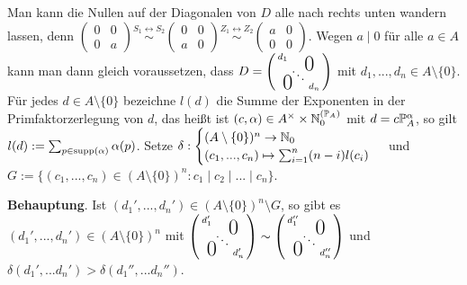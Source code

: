 \documentclass[../../main.tex]{subfiles}
\begin{document}
\begin{cproof}
Man kann die Nullen auf der Diagonalen von $D$ alle nach rechts unten wandern lassen, denn $\begin{pmatrix*}0&0\\ 0&a\end{pmatrix*}\stackrel{S_1\leftrightarrow S_2}{\sim}\begin{pmatrix*}0&0\\ a&0\end{pmatrix*}\stackrel{Z_1\leftrightarrow Z_2}{\sim}\begin{pmatrix*}a&0\\0&0\end{pmatrix*}$. Wegen $a\mid 0$ für alle $a\in A$ kann man dann gleich voraussetzen, dass $D= \left(\begin{smallmatrix}
d_1 & & \llap{$\overset{\blap{\LARGE 0}}{~}$} \\
& \ddots &\\
\rlap{\tlap{\LARGE 0}} & & d_n
\end{smallmatrix}\right)$ mit $d_1,...,d_n\in A\setminus\{0\}$. Für jedes $d\in A\setminus\{0\}$ bezeichne $l(d)$ die Summe der Exponenten in der Primfaktorzerlegung von $d$, das heißt ist $(c,\alpha)\in A^\times\times \expfam$ mit $d=c\P_A^\alpha$, so gilt $l(d):=\sum_{p\in\supp(\alpha)}\alpha(p)$. Setze $\delta:\begin{cases}(A\setminus\{0\})^n\to\N_0\\(c_1,...,c_n)\mapsto \sum_{i=1}^n(n-i)l(c_i)\end{cases}$ und $G:=\{(c_1,...,c_n)\in (A\setminus\{0\})^n: c_1\mid c_2\mid ...\mid c_n\}$.\\

\begin{tcolorbox}[arc=0mm, boxrule=0.2mm]\noindent\textbf{Behauptung}. Ist $(d_1',...,d_n')\in (A\setminus\{0\})^n\setminus G$, so gibt es $(d_1',...,d_n')\in (A\setminus\{0\})^n$ mit $\left(\begin{smallmatrix}
d'_1 & & \llap{$\overset{\blap{\LARGE 0}}{~}$} \\
& \ddots &\\
\rlap{\tlap{\LARGE 0}} & & d'_n
\end{smallmatrix}\right)\sim \left(\begin{smallmatrix}
d''_1 & & \llap{$\overset{\blap{\LARGE 0}}{~}$} \\
& \ddots &\\
\rlap{\tlap{\LARGE 0}} & & d''_n
\end{smallmatrix}\right)$ und $\delta(d_1',...d_n')>\delta(d_1'',...d_n'')$.\\


\end{tcolorbox}
\end{cproof}
\end{document}
